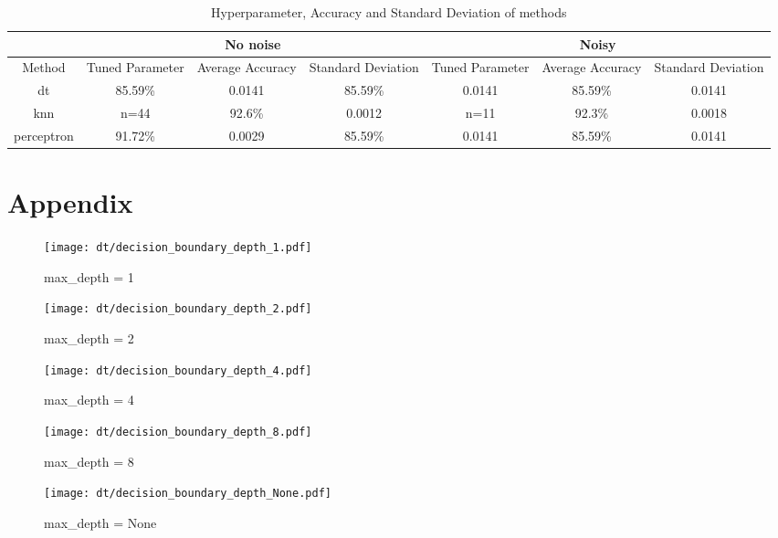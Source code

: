 \documentclass[acmconf,nonacm=true]{acmart}
\begin{document}
\begin{enumerate}
\begin{enumerate}
\end{enumerate}
\begin{table}[H]
    \centering
    \caption{Hyperparameter, Accuracy and Standard Deviation of methods}
    \begin{tabular}{|c||c|c|c||c|c|c|}
    \hline
    \multicolumn{1}{|c||}{} &\multicolumn{3}{c||}{No noise} & \multicolumn{3}{c|}{Noisy} \\
    \hline
    Method & Tuned Parameter & Average Accuracy & Standard Deviation & Tuned Parameter & Average Accuracy & Standard Deviation\\
    \hline
    dt & 85.59\% & 0.0141 & 85.59\% & 0.0141 & 85.59\% & 0.0141\\
    knn & n=44 & 92.6\% & 0.0012 & n=11 & 92.3\% & 0.0018\\
    perceptron & 91.72\% & 0.0029 & 85.59\% & 0.0141 & 85.59\% & 0.0141\\
    \hline
    \end{tabular}
\end{table}

\end{enumerate}


\section{Appendix}
\begin{figure}[H]
    \centering  
    \texttt{[image: dt/decision\_boundary\_depth\_1.pdf]}
    \caption{max\_depth = 1}
\end{figure}

\begin{figure}[H]
    \centering
    \texttt{[image: dt/decision\_boundary\_depth\_2.pdf]}
    \caption{max\_depth = 2}
\end{figure}

\begin{figure}[H]
    \centering
    \texttt{[image: dt/decision\_boundary\_depth\_4.pdf]}
    \caption{max\_depth = 4}
\end{figure}

\begin{figure}[H]
    \centering  
    \texttt{[image: dt/decision\_boundary\_depth\_8.pdf]}
    \caption{max\_depth = 8}
\end{figure}

\begin{figure}[H]
    \centering  
    \texttt{[image: dt/decision\_boundary\_depth\_None.pdf]}
    \caption{max\_depth = None}
\end{figure}
\end{document}
